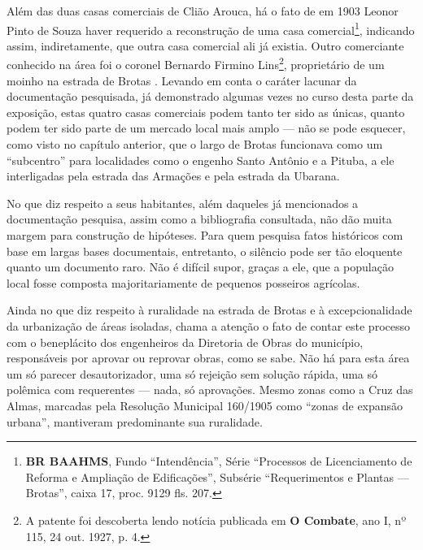 
Além das duas casas comerciais de Clião Arouca, há o fato de em 1903 Leonor Pinto de Souza haver requerido a reconstrução de uma casa comercial\footnote{\textbf{BR BAAHMS}, Fundo ``Intendência'', Série ``Processos de Licenciamento de Reforma e Ampliação de Edificações'', Subsérie ``Requerimentos e Plantas --- Brotas'', caixa 17, proc. 9129 fls. 207.}, indicando assim, indiretamente, que outra casa comercial ali já existia. Outro comerciante conhecido na área foi o coronel Bernardo Firmino Lins\footnote{A patente foi descoberta lendo notícia publicada em \textbf{O Combate}, ano I, nº 115, 24 out. 1927, p. 4.}, proprietário de um moinho na estrada de Brotas \cite[p.~433]{reis_almanak_1898}. Levando em conta o caráter lacunar da documentação pesquisada, já demonstrado algumas vezes no curso desta parte da exposição, estas quatro casas comerciais podem tanto ter sido as únicas, quanto podem ter sido parte de um mercado local mais amplo --- não se pode esquecer, como visto no capítulo anterior, que o largo de Brotas funcionava como um ``subcentro'' para localidades como o engenho Santo Antônio e a Pituba, a ele interligadas pela estrada das Armações e pela estrada da Ubarana.


No que diz respeito a seus habitantes, além daqueles já mencionados a documentação pesquisa, assim como a bibliografia consultada, não dão muita margem para construção de hipóteses. Para quem pesquisa fatos históricos com base em largas bases documentais, entretanto, o silêncio pode ser tão eloquente quanto um documento raro. Não é difícil supor, graças a ele, que a população local fosse composta majoritariamente de pequenos posseiros agrícolas.


Ainda no que diz respeito à ruralidade na estrada de Brotas e à excepcionalidade da urbanização de áreas isoladas, chama a atenção o fato de contar este processo com o beneplácito dos engenheiros da Diretoria de Obras do município, responsáveis por aprovar ou reprovar obras, como se sabe. Não há para esta área um só parecer desautorizador, uma só rejeição sem solução rápida, uma só polêmica com requerentes --- nada, só aprovações. Mesmo zonas como a Cruz das Almas, marcadas pela Resolução Municipal 160/1905 como ``zonas de expansão urbana'', mantiveram predominante sua ruralidade.

